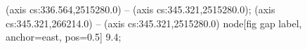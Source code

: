  (axis cs:336.564,2515280.0) -- (axis cs:345.321,2515280.0);
 (axis cs:345.321,266214.0) -- (axis cs:345.321,2515280.0)
  node[fig gap label, anchor=east, pos=0.5] {\texttimes{}9.4};
